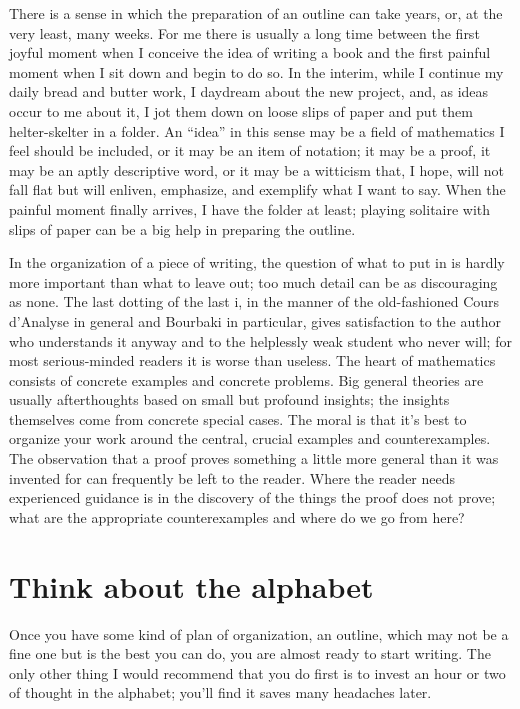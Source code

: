 \documentclass[12pt]{article}
\begin{document}
There is a sense in which the preparation of an outline can take years, or, at the very least, many weeks. For me there is usually a long time between the first joyful moment when I conceive the idea of writing a book and the first painful moment when I sit down and begin to do so. In the interim, while I continue my daily bread and butter work, I daydream about the new project, and, as ideas occur to me about it, I jot them down on loose slips of paper and put them helter-skelter in a folder. An ``idea'' in this sense may be a field of mathematics I feel should be included, or it may be an item of notation; it may be a proof, it may be an aptly descriptive word, or it may be a witticism that, I hope, will not fall flat but will enliven, emphasize, and exemplify what I want to say. When the painful moment finally arrives, I have the folder at least; playing solitaire with slips of paper can be a big help in preparing the outline. 

In the organization of a piece of writing, the question of what to put in is hardly more important than what to leave out; too much detail can be as discouraging as none. The last dotting of the last i, in the manner of the old-fashioned Cours d'Analyse in general and Bourbaki in particular, gives satisfaction to the author who understands it anyway and to the helplessly weak student who never will; for most serious-minded readers it is worse than useless. The heart of mathematics consists of concrete examples and concrete problems. Big general theories are usually afterthoughts based on small but profound insights; the insights themselves come from concrete special cases. The moral is that it's best to organize your work around the central, crucial examples and counterexamples. The observation that a proof proves something a little more general than it was invented for can frequently be left to the reader. Where the reader needs experienced guidance is in the discovery of the things the proof does not prove; what are the appropriate counterexamples and where do we go from here?

\section{Think about the alphabet}

Once you have some kind of plan of organization, an outline, which may not be a fine one but is the best you can do, you are almost ready to start writing. The only other thing I would recommend that you do first is to invest an hour or two of thought in the alphabet; you'll find it saves many headaches later.
\end{document}

